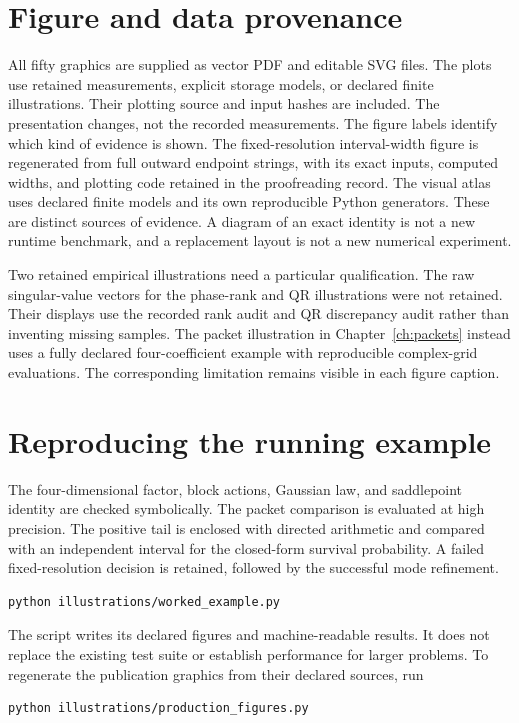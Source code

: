 \section{Figure and data provenance}\label{app:provenance}
All fifty graphics are supplied as vector PDF and editable SVG files. The plots use retained measurements, explicit storage models, or declared finite illustrations. Their plotting source and input hashes are included. The presentation changes, not the recorded measurements. The figure labels identify which kind of evidence is shown. The fixed-resolution
interval-width figure is regenerated from full outward endpoint strings,
with its exact inputs, computed widths, and plotting code retained in the
proofreading record. The visual atlas
uses declared finite models and its own reproducible Python generators.
These are distinct sources of evidence. A diagram of an exact identity is
not a new runtime benchmark, and a replacement layout is not a new numerical
experiment.

Two retained empirical illustrations need a particular qualification. The raw
singular-value vectors for the phase-rank and QR illustrations were not retained. Their
displays use the recorded rank audit and QR discrepancy audit rather than inventing
missing samples. The packet illustration in Chapter~\ref{ch:packets} instead uses a
fully declared four-coefficient example with reproducible complex-grid evaluations.
The corresponding limitation remains visible in each figure caption.

\section{Reproducing the running example}
The four-dimensional factor, block actions, Gaussian law, and saddlepoint identity are checked symbolically. The packet comparison is evaluated at high precision. The positive tail is enclosed with directed arithmetic and compared with an independent interval for the closed-form survival probability. A failed fixed-resolution decision is retained, followed by the successful mode refinement.
\begin{lstlisting}
python illustrations/worked_example.py
\end{lstlisting}
The script writes its declared figures and machine-readable results. It does not replace the existing test suite or establish performance for larger problems. To regenerate the publication graphics from their declared sources, run
\begin{lstlisting}
python illustrations/production_figures.py
\end{lstlisting}

